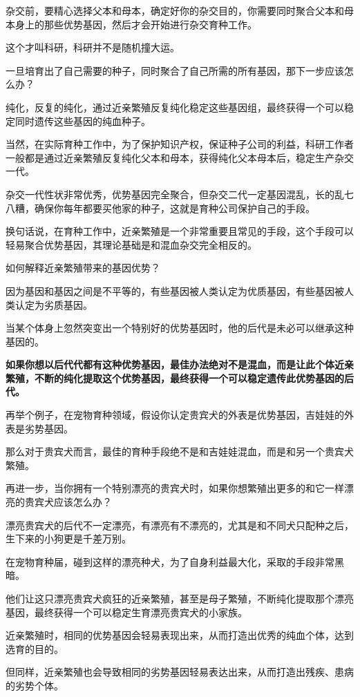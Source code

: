 \documentclass[UTF8, 11pt, oneside]{ctexart}
\newcommand{\zd}[1]{\textbf{\textcolor[RGB]{123,12,0}{#1}}} %
\begin{document}
杂交前，要精心选择父本和母本，确定好你的杂交目的，你需要同时聚合父本和母本身上的那些优势基因，然后才会开始进行杂交育种工作。

这个才叫科研，科研并不是随机撞大运。

一旦培育出了自己需要的种子，同时聚合了自己所需的所有基因，那下一步应该怎么办？

纯化，反复的纯化，通过近亲繁殖反复纯化稳定这些基因组，最终获得一个可以稳定同时遗传这些基因的纯血种子。

当然，在实际育种工作中，为了保护知识产权，保证种子公司的利益，科研工作者一般都是通过近亲繁殖反复纯化父本和母本，获得纯化父本母本后，稳定生产杂交一代。

杂交一代性状非常优秀，优势基因完全聚合，但杂交二代一定基因混乱，长的乱七八糟，确保你每年都要买他家的种子，这就是育种公司保护自己的手段。

换句话说，在育种工作中，近亲繁殖是一个非常重要且常见的手段，这个手段可以轻易聚合优势基因，其理论基础是和混血杂交完全相反的。

如何解释近亲繁殖带来的基因优势？

因为基因和基因之间是不平等的，有些基因被人类认定为优质基因，有些基因被人类认定为劣质基因。

当某个体身上忽然突变出一个特别好的优势基因时，他的后代是未必可以继承这种基因的。

\zd{如果你想以后代代都有这种优势基因，最佳办法绝对不是混血，而是让此个体近亲繁殖，不断的纯化提取这个优势基因，最终获得一个可以稳定遗传此优势基因的后代。}

再举个例子，在宠物育种领域，假设你认定贵宾犬的外表是优势基因，吉娃娃的外表是劣势基因。

那么对于贵宾犬而言，最佳的育种手段绝不是和吉娃娃混血，而是和另一个贵宾犬繁殖。

再进一步，当你拥有一个特别漂亮的贵宾犬时，如果你想繁殖出更多的和它一样漂亮的贵宾犬应该怎么办？

漂亮贵宾犬的后代不一定漂亮，有漂亮有不漂亮的，尤其是和不同犬只配种之后，生下来的小狗更是千差万别。

在宠物育种届，碰到这样的漂亮种犬，为了自身利益最大化，采取的手段非常黑暗。

他们让这只漂亮贵宾犬疯狂的近亲繁殖，甚至是母子繁殖，不断纯化提取那个漂亮基因，最终获得一个可以稳定生育漂亮贵宾犬的小家族。

近亲繁殖时，相同的优势基因会轻易表现出来，从而打造出优秀的纯血个体，达到选育的目的。

但同样，近亲繁殖也会导致相同的劣势基因轻易表达出来，从而打造出残疾、患病的劣势个体。
\end{document}
